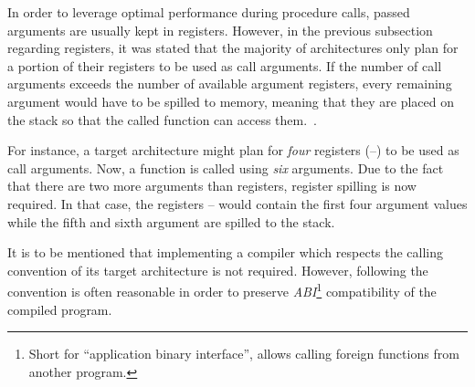 In order to leverage optimal performance during procedure calls, passed arguments are usually kept in registers.
However, in the previous subsection regarding registers, it was stated that the majority of architectures only plan for a portion of their registers to be used as call arguments.
If the number of call arguments exceeds the number of available argument registers, every remaining argument would have to be spilled to memory,
meaning that they are placed on the stack so that the called function can access them.~\cite[p.~98]{Patterson2017-zq}.

For instance, a target architecture might plan for \emph{four} registers (--) to be used as call arguments.
Now, a function is called using \emph{six} arguments.
Due to the fact that there are two more arguments than registers, register spilling is now required.
In that case, the registers -- would contain the first four argument values while the fifth and sixth argument are spilled to the stack.
%

It is to be mentioned that implementing a compiler which respects the calling convention of its target architecture is not required.
However, following the convention is often reasonable in order to preserve \emph{ABI}\footnote{Short for \enquote{application binary interface}, allows calling foreign functions from another program.} compatibility of the compiled program.

